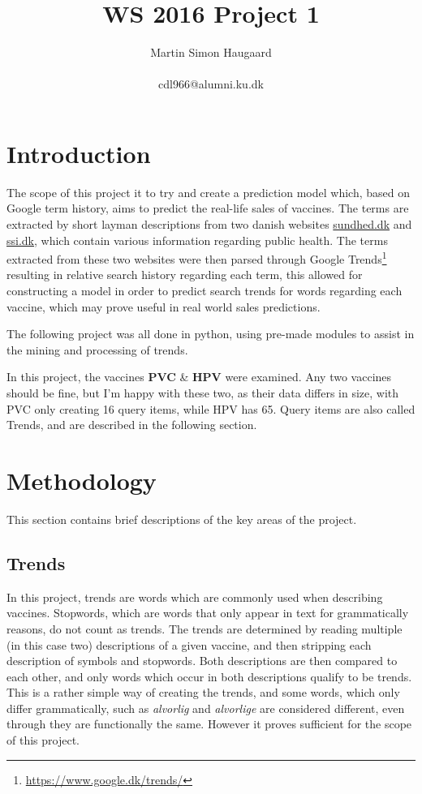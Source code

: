 \documentclass{sig-alternate}
\begin{document}
\crdata{}

\title{WS 2016 Project 1}
\author{
\alignauthor 
Martin Simon Haugaard\\~\\cdl966@alumni.ku.dk
}
\maketitle

\section{Introduction}
The scope of this project it to try and create a prediction model which, based on Google term history, aims to predict the real-life sales of vaccines. The terms are extracted by short layman descriptions from two danish websites \url{sundhed.dk} and \url{ssi.dk}, which contain various information regarding public health. The terms extracted from these two websites were then parsed through Google Trends\footnote{\url{https://www.google.dk/trends/}} resulting in relative search history regarding each term, this allowed for constructing a model in order to predict search trends for words regarding each vaccine, which may prove useful in real world sales predictions.

The following project was all done in python, using pre-made modules to assist in the mining and processing of trends.

In this project, the vaccines \textbf{PVC} \& \textbf{HPV} were examined. Any two vaccines should be fine, but I'm happy with these two, as their data differs in size, with PVC only creating 16 query items, while HPV has 65. Query items are also called Trends, and are described in the following section.

\section{Methodology}
This section contains brief descriptions of the key areas of the project.
\subsection{Trends}
In this project, trends are words which are commonly used when describing vaccines. Stopwords, which are words that only appear in text for grammatically reasons, do not count as trends. The trends are determined by reading multiple (in this case two) descriptions of a given vaccine, and then stripping each description of symbols and stopwords. Both descriptions are then compared to each other, and only words which occur in both descriptions qualify to be trends. This is a rather simple way of creating the trends, and some words, which only differ grammatically, such as \textit{alvorlig} and \textit {alvorlige} are considered different, even through they are functionally the same. However it proves sufficient for the scope of this project.
\end{document}
